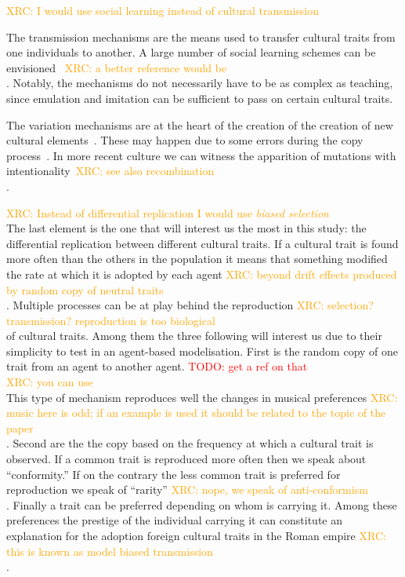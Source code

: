 \documentclass{wscpaperproc}
\newcommand{\memo}[2]{\textcolor{#1}{#2}}
\newcommand{\todo}[1]{\memo{red}{TODO: #1\\}}
\newcommand{\xrc}[1]{\memo{orange}{XRC: #1\\}}
\begin{document}
\xrc{I would use social learning instead of cultural transmission}

The transmission mechanisms are the means used to transfer cultural traits from one individuals to another. A large number of social learning schemes can be envisioned~\cite{heyes_social_1994} \xrc{a better reference would be \cite{henrich_evolution_2003}}. Notably, the mechanisms do not necessarily have to be as complex as teaching, since emulation and imitation can be sufficient to pass on certain cultural traits.

The variation mechanisms are at the heart of the creation of the creation of new cultural elements~\cite{obrien_variation_1990}. These may happen due to some errors during the copy process~\cite{schillinger_copying_2014}. In more recent culture we can witness the apparition of mutations with intentionality~\cite{ziman_technological_2003}\xrc{see also recombination \cite{sole_2013}}.

\xrc{Instead of differential replication I would use \emph{biased selection}}
The last element is the one that will interest us the most in this study: the differential replication between different cultural traits. If a cultural trait is found more often than the others in the population it means that something modified the rate at which it is adopted by each agent \xrc{beyond drift effects produced by random copy of neutral traits \cite{bentley_2004}}.
Multiple processes can be at play behind the reproduction \xrc{selection? transmission? reproduction is too biological} of cultural traits. Among them the three following will interest us due to their simplicity to test in an agent-based modelisation. First is the random copy of one trait from an agent to another agent. 
\todo{get a ref on that} \xrc{you can use \cite{bentley_2004}}
This type of mechanism reproduces well the changes in musical preferences \xrc{music here is odd; if an example is used it should be related to the topic of the paper}. Second are the the copy based on the frequency at which a cultural trait is observed. If a common trait is reproduced more often then we speak about ``conformity.'' If on the contrary the less common trait is preferred for reproduction we speak of ``rarity'' \xrc{nope, we speak of anti-conformism}. Finally a trait can be preferred depending on whom is carrying it. Among these preferences the prestige of the individual carrying it can constitute an explanation for the adoption foreign cultural traits in the Roman empire \xrc{this is known as model biased transmission}.
\end{document}
